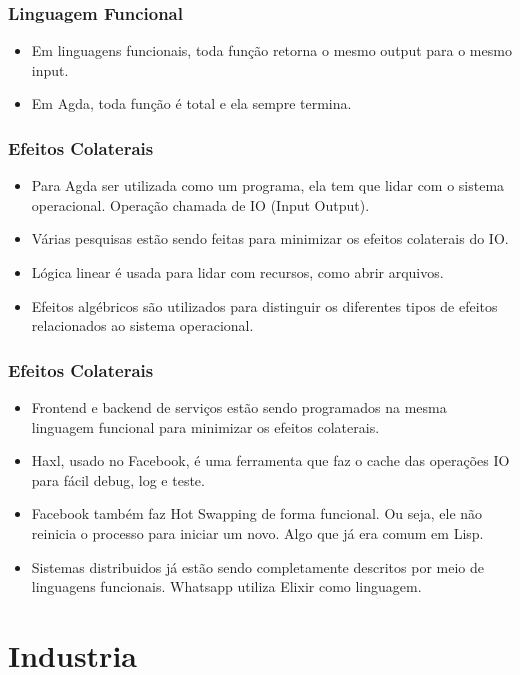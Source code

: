 \documentclass{beamer}
\begin{document}
\begin{frame}
\frametitle{Linguagem Funcional}
\begin{itemize}
  \item Em linguagens funcionais, toda função retorna o mesmo output para o mesmo input.
  \item Em Agda, toda função é total e ela sempre termina.
\end{itemize}
\end{frame}

\begin{frame}
\frametitle{Efeitos Colaterais}
\begin{itemize}
  \item Para Agda ser utilizada como um programa, ela tem que lidar com o sistema operacional.
    Operação chamada de IO (Input Output).
  \item Várias pesquisas estão sendo feitas para minimizar os efeitos colaterais do IO.
  \item Lógica linear é usada para lidar com recursos, como abrir arquivos.
  \item Efeitos algébricos são utilizados para distinguir os diferentes tipos de efeitos
    relacionados ao sistema operacional.
\end{itemize}
\end{frame}

\begin{frame}
\frametitle{Efeitos Colaterais}
\begin{itemize}
  \item Frontend e backend de serviços estão sendo programados na mesma linguagem funcional
    para minimizar os efeitos colaterais.
  \item Haxl, usado no Facebook, é uma ferramenta que faz o cache das operações IO para
    fácil debug, log e teste.
  \item Facebook também faz Hot Swapping de forma funcional.
    Ou seja, ele não reinicia o processo para iniciar um novo.
    Algo que já era comum em Lisp.
  \item Sistemas distribuidos já estão sendo completamente descritos por meio de linguagens funcionais.
    Whatsapp utiliza Elixir como linguagem.
\end{itemize}
\end{frame}

\section{Industria}
\end{document}
